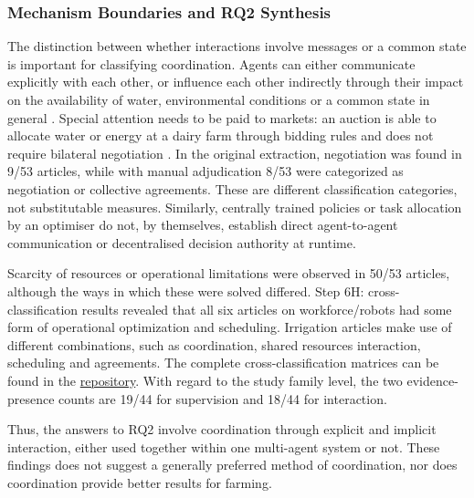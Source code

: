 \documentclass[11pt,a4paper]{article}
\begin{document}
\subsubsection{Mechanism Boundaries and RQ2 Synthesis}

The distinction between whether interactions involve messages or a
common state is important for classifying coordination.
Agents can either communicate explicitly with each other, or influence
each other indirectly through their impact on the availability of
water, environmental conditions or a common state in general
\parencite{feuillette_sinuse_2003,becu_agent_2003,
barreteau_suitability_2004}. Special attention needs to be paid to
markets: an auction is able to allocate water or energy at a dairy farm
through bidding rules and does not require bilateral negotiation
\parencite{chiewchan_improving_2020,shah_peer--peer_2024}.
In the original extraction, negotiation was found in 9/53 articles,
while with manual adjudication 8/53 were categorized as negotiation or
collective agreements. These are different classification categories,
not substitutable measures. Similarly, centrally trained policies or task allocation by an optimiser do not, by themselves, establish direct agent-to-agent communication or decentralised decision authority at runtime.

Scarcity of resources or operational limitations were observed in 50/53
articles, although the ways in which these were solved differed.
Step 6H: cross-classification results revealed that all six articles on workforce/robots had some form of operational optimization and scheduling. Irrigation articles make use of different combinations, such as coordination, shared resources interaction, scheduling and agreements. The complete cross-classification matrices can be found in the \href{https://github.com/ChayanTalukder/Multi-Agent-Systems-for-Sustainable-Smart-Farming} {repository}. With regard to the study family level, the two evidence-presence counts are 19/44 for supervision and 18/44 for interaction.

Thus, the answers to RQ2 involve coordination through explicit and implicit
interaction, either used together within one multi-agent system or not.
These findings does not suggest a generally preferred method of coordination,
nor does coordination provide better results for farming.



\end{document}
